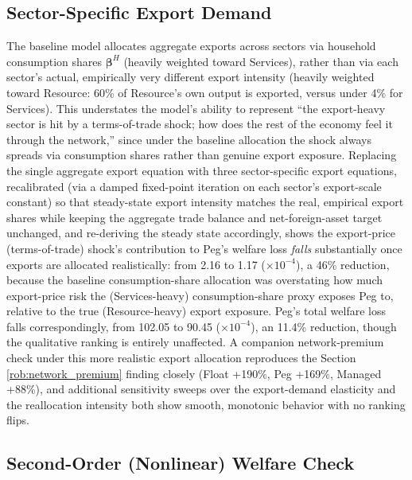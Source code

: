 \documentclass[12pt]{article}
\begin{document}
\subsection{Sector-Specific Export Demand}
\label{rob:export}

The baseline model allocates aggregate exports across sectors via household consumption shares
$\bm\beta^H$ (heavily weighted toward Services), rather than via each sector's actual, empirically
very different export intensity (heavily weighted toward Resource: 60\% of Resource's own output is
exported, versus under 4\% for Services). This understates the model's ability to represent
``the export-heavy sector is hit by a terms-of-trade shock; how does the rest of the economy feel it
through the network,'' since under the baseline allocation the shock always spreads via consumption
shares rather than genuine export exposure. Replacing the single aggregate export equation with three
sector-specific export equations, recalibrated (via a damped fixed-point iteration on each sector's
export-scale constant) so that steady-state export intensity matches the real, empirical export shares
while keeping the aggregate trade balance and net-foreign-asset target unchanged, and re-deriving the
steady state accordingly, shows the export-price (terms-of-trade) shock's contribution to Peg's
welfare loss \emph{falls} substantially once exports are allocated realistically: from 2.16 to 1.17
($\times10^{-4}$), a 46\% reduction, because the baseline consumption-share allocation was overstating
how much export-price risk the (Services-heavy) consumption-share proxy exposes Peg to, relative to
the true (Resource-heavy) export exposure. Peg's total welfare loss falls correspondingly, from 102.05
to 90.45 ($\times10^{-4}$), an 11.4\% reduction, though the qualitative ranking is entirely unaffected.
A companion network-premium check under this more realistic export allocation reproduces the Section
\ref{rob:network_premium} finding closely (Float +190\%, Peg +169\%, Managed +88\%), and additional
sensitivity sweeps over the export-demand elasticity and the reallocation intensity both show smooth,
monotonic behavior with no ranking flips.

\subsection{Second-Order (Nonlinear) Welfare Check}
\label{rob:second_order}
\end{document}
